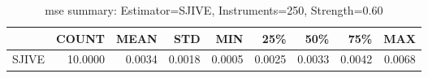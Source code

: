 \begin{table}[ht]
\centering
\caption{mse summary: Estimator=SJIVE, Instruments=250, Strength=0.60}
\begin{tabular}{lrrrrrrrr}
\toprule
 & COUNT & MEAN & STD & MIN & 25\% & 50\% & 75\% & MAX \\
\midrule
SJIVE & 10.0000 & 0.0034 & 0.0018 & 0.0005 & 0.0025 & 0.0033 & 0.0042 & 0.0068 \\
\bottomrule
\end{tabular}
\end{table}
